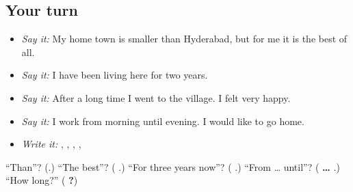 \subsection*{Your turn}
\begin{itemize}
\raggedright
  \item \emph{Say it:} My home town is smaller than Hyderabad, but for me it is the best of all.
  \item \emph{Say it:} I have been living here for two years.
  \item \emph{Say it:} After a long time I went to the village. I felt very happy.
  \item \emph{Say it:} I work from morning until evening. I would like to go home.
  \item \emph{Write it:} \textbf{}, \textbf{}, \textbf{}, \textbf{}, \textbf{}
\end{itemize}

\begin{tcolorbox}[breakable,colback=teal!4,colframe=teal!35!black,title={Before you move on}]
\textquotedblleft{}Than\textquotedblright{}? (\textbf{}.) \textquotedblleft{}The best\textquotedblright{}? (\textbf{ }.) \textquotedblleft{}For three years now\textquotedblright{}? (\textbf{ }.) \textquotedblleft{}From … until\textquotedblright{}? (\textbf{ … }.) \textquotedblleft{}How long?\textquotedblright{} (\textbf{ ?})
\end{tcolorbox}
